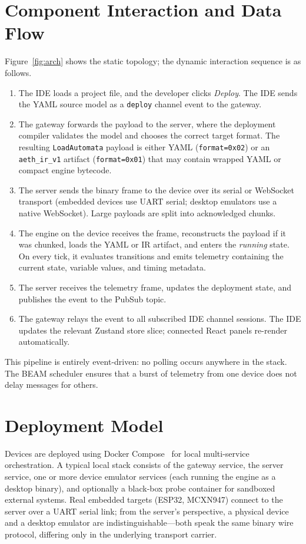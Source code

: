 \section{Component Interaction and Data Flow}
\label{sec:dataflow}

Figure~\ref{fig:arch} shows the static topology; the dynamic interaction sequence is as follows.

\begin{enumerate}
  \item The IDE loads a project file, and the developer clicks \textit{Deploy}. The IDE sends the YAML source model as a \texttt{deploy} channel event to the gateway.
  \item The gateway forwards the payload to the server, where the deployment compiler validates the model and chooses the correct target format. The resulting \texttt{LoadAutomata} payload is either YAML (\texttt{format=0x02}) or an \texttt{aeth\_ir\_v1} artifact (\texttt{format=0x01}) that may contain wrapped YAML or compact engine bytecode.
  \item The server sends the binary frame to the device over its serial or WebSocket transport (embedded devices use UART serial; desktop emulators use a native WebSocket). Large payloads are split into acknowledged chunks.
  \item The engine on the device receives the frame, reconstructs the payload if it was chunked, loads the YAML or IR artifact, and enters the \textit{running} state. On every tick, it evaluates transitions and emits telemetry containing the current state, variable values, and timing metadata.
  \item The server receives the telemetry frame, updates the deployment state, and publishes the event to the PubSub topic.
  \item The gateway relays the event to all subscribed IDE channel sessions. The IDE updates the relevant Zustand store slice; connected React panels re-render automatically.
\end{enumerate}

This pipeline is entirely event-driven: no polling occurs anywhere in the stack. The BEAM scheduler ensures that a burst of telemetry from one device does not delay messages for others.

\section{Deployment Model}

Devices are deployed using Docker Compose~\cite{Docker} for local multi-service orchestration. A typical local stack consists of the gateway service, the server service, one or more device emulator services (each running the engine as a desktop binary), and optionally a black-box probe container for sandboxed external systems. Real embedded targets (ESP32, MCXN947) connect to the server over a UART serial link; from the server's perspective, a physical device and a desktop emulator are indistinguishable---both speak the same binary wire protocol, differing only in the underlying transport carrier.

